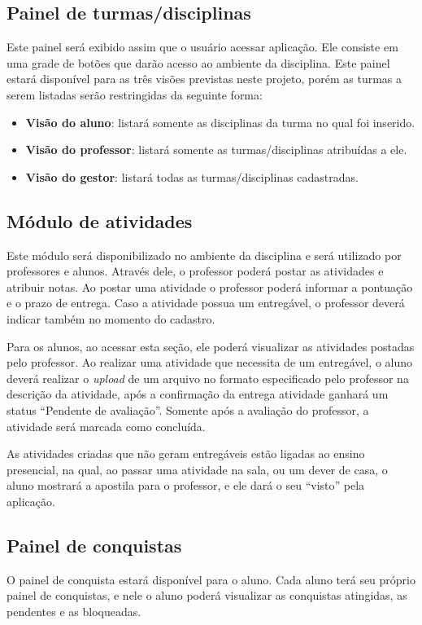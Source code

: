 \documentclass[
    12pt,               %
    openright,          %
    oneside,
    a4paper,            %
    paginasA3,  %
    english,            %
    brazil              %
    ]{ifsp-spo-inf-ctds} %
\begin{document}
\subsection{Painel de turmas/disciplinas}
Este painel será exibido assim que o usuário acessar aplicação. Ele consiste em uma grade de botões que darão acesso ao ambiente da disciplina. Este painel estará disponível para as três visões previstas neste projeto, porém as turmas a serem listadas serão restringidas da seguinte forma:

\begin{itemize}
\item \textbf{Visão do aluno}: listará somente as disciplinas da turma no qual foi inserido.
\item \textbf{Visão do professor}: listará somente as turmas/disciplinas atribuídas a ele.
\item \textbf{Visão do gestor}: listará todas as turmas/disciplinas cadastradas.
\end{itemize}


\subsection{Módulo de atividades}
Este módulo será disponibilizado no ambiente da disciplina e será utilizado por professores e alunos. Através dele, o professor poderá postar as atividades e atribuir notas. Ao postar uma atividade o professor poderá informar a pontuação e o prazo de entrega. Caso a atividade possua um entregável, o professor deverá indicar também no momento do cadastro.


Para os alunos, ao acessar esta seção, ele poderá visualizar as atividades postadas pelo professor. Ao realizar uma atividade que necessita de um entregável, o aluno deverá realizar o \textit{upload} de um arquivo no formato especificado pelo professor na descrição da atividade, após a confirmação da entrega atividade ganhará um status “Pendente de avaliação”. Somente após a avaliação do professor, a atividade será marcada como concluída.


As atividades criadas que não geram entregáveis estão ligadas ao ensino presencial, na qual, ao passar uma atividade na sala, ou um dever de casa, o aluno mostrará a apostila para o professor, e ele dará o seu “visto” pela aplicação. 

\subsection{Painel de conquistas}
O painel de conquista estará disponível para o aluno. Cada aluno terá seu próprio painel de conquistas, e nele o aluno poderá visualizar as conquistas atingidas, as pendentes e as bloqueadas. 
\end{document}
